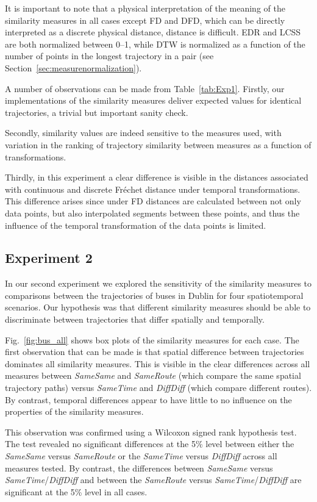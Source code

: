 \documentclass[10pt,letterpaper]{article}
\begin{document}
It is important to note that a physical interpretation of the meaning of the similarity measures in all cases except FD and DFD, which can be directly interpreted as a discrete physical distance, distance is difficult. EDR and LCSS are both normalized between 0--1, while DTW is normalized as a function of the number of points in the longest trajectory in a pair (see Section~\ref{sec:measurenormalization}). 

A number of observations can be made from Table~\ref{tab:Exp1}. Firstly, our implementations of the similarity measures deliver expected values for identical trajectories, a trivial but important sanity check. 

Secondly, similarity values are indeed sensitive to the measures used, with variation in the ranking of trajectory similarity between measures as a function of transformations.

Thirdly, in this experiment a clear difference is visible in the distances associated with continuous and discrete Fréchet distance under temporal transformations. This difference arises since under FD distances are calculated between not only data points, but also interpolated segments between these points, and thus the influence of the temporal transformation of the data points is limited. 


    

\subsection{Experiment 2}
\label{par:result_2}
In our second experiment we explored the sensitivity of the similarity measures to comparisons between the trajectories of buses in Dublin for four spatiotemporal scenarios. Our hypothesis was that different similarity measures should be able to discriminate between trajectories that differ spatially and temporally.  

Fig.~\ref{fig:bus_all} shows box plots of the similarity measures for each case. The first observation that can be made is that spatial difference between trajectories dominates all similarity measures. This is visible in the clear differences across all measures between \emph{SameSame} and \emph{SameRoute} (which compare the same spatial trajectory paths) versus \emph{SameTime} and \emph{DiffDiff} (which compare different routes). By contrast, temporal differences appear to have little to no influence on the properties of the similarity measures. 

This observation was confirmed using a Wilcoxon signed rank hypothesis test. The test revealed no significant differences at the 5\% level between either the \textit{SameSame} versus \textit{SameRoute} or the \textit{SameTime} versus \textit{DiffDiff} across all measures tested. By contrast, the differences between \textit{SameSame} versus  \textit{SameTime}/\textit{DiffDiff} and between the \textit{SameRoute} versus  \textit{SameTime}/\textit{DiffDiff} are significant at the 5\% level in all cases. 
\end{document}
